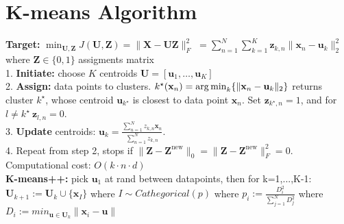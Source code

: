 \section{K-means Algorithm}
\textbf{Target:} $\min_{\mathbf{U}, \mathbf{Z}} J(\mathbf{U}, \mathbf{Z}) = \|\mathbf{X} - \mathbf{U} \mathbf{Z}\|_F^2$
$= \sum_{n=1}^N \sum_{k=1}^K \mathbf{z}_{k,n} \|\mathbf{x}_n - \mathbf{u}_k\|_2^2$ where $\mathbf{Z} \in \{0,1\}$ assigments matrix \\
1. \textbf{Initiate:} choose $K$ centroids $\mathbf{U} = [\mathbf{u}_1, \ldots, \mathbf{u}_K]$\\
2. \textbf{Assign:} data points to clusters. $k^\star(\mathbf{x}_n) = \operatorname*{arg\,min}_k \{ \|\mathbf{x}_n - \mathbf{u}_k\|_2 \}$ returns cluster $k^\star$, whose centroid $\mathbf{u}_{k^\star}$ is closest to data point $\mathbf{x}_n$. Set $\mathbf{z}_{k^\star,n} = 1$, and for $ l \neq k^\star~ \mathbf{z}_{l,n}=0$.\\
3. \textbf{Update} centroids: $\mathbf{u}_k = \frac{\sum_{n=1}^N z_{k,n} \mathbf{x}_n}{\sum_{n=1}^N z_{k,n}}$.\\
4. Repeat from step 2, stops if $\|\mathbf{Z} - \mathbf{Z}^\text{new}\|_0 = \|\mathbf{Z} - \mathbf{Z}^\text{new}\|^2_F = 0$.\\
Computational cost: $O(k\cdot n \cdot d)$\\
\textbf{K-means++:} pick $\mathbf{u}_1$ at rand between datapoints, then for k=1,...,K-1: $\mathbf{U}_{k+1} := \mathbf{U}_{k} \cup \{\mathbf{x}_I\}$ where $I \sim Cathegorical(p)$ where $p_i := \frac{D_i^2}{\sum_{j=1}^N{D_j^2}}$ where $D_i := min_{\mathbf{u} \in \mathbf{U}_k}\|\mathbf{x}_i - \mathbf{u}\|$
